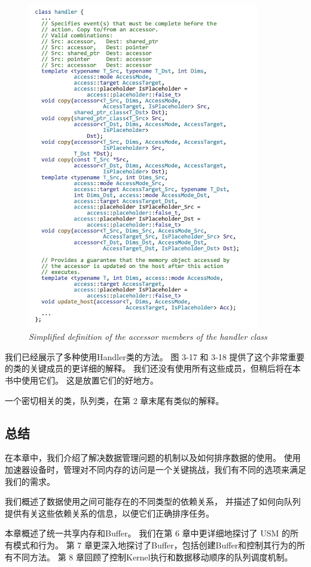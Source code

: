 \begin{figure}[H]
	\centering
	\includegraphics[width=0.9\textwidth]{figs/F3.18.png}
	\caption{\textit{Simplified definition of the accessor members of the handler class}}
\end{figure}

我们已经展示了多种使用Handler类的方法。 图 3-17 和 3-18 提供了这个非常重要的类的关键成员的更详细的解释。 
我们还没有使用所有这些成员，但稍后将在本书中使用它们。 这是放置它们的好地方。

一个密切相关的类，队列类，在第 2 章末尾有类似的解释。

\subsection{总结}
在本章中，我们介绍了解决数据管理问题的机制以及如何排序数据的使用。 
使用加速器设备时，管理对不同内存的访问是一个关键挑战，我们有不同的选项来满足我们的需求。

我们概述了数据使用之间可能存在的不同类型的依赖关系，
并描述了如何向队列提供有关这些依赖关系的信息，以便它们正确排序任务。

本章概述了统一共享内存和Buffer。 我们在第 6 章中更详细地探讨了 USM 的所有模式和行为。
第 7 章更深入地探讨了Buffer，包括创建Buffer和控制其行为的所有不同方法。 
第 8 章回顾了控制Kernel执行和数据移动顺序的队列调度机制。